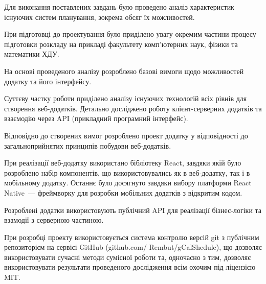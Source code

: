 
Для виконання поставлених завдань було проведено аналіз характеристик існуючих систем планування, зокрема обсяг їх можливостей.

При підготовці до проектування було приділено увагу окремим частини процесу підготовки розкладу на прикладі факультету комп’ютерних наук, фізики та математики ХДУ.

На основі проведеного аналізу розроблено базові вимоги щодо можливостей додатку та його інтерфейсу.

Суттєву частку роботи приділено аналізу існуючих технологій всіх рівнів для створення веб-додатків. Детально досліджено роботу клієнт-серверних додатків та взаємодію через API (прикладний програмний інтерфейс). 

Відповідно до створених вимог розроблено проект додатку у відповідності до загальноприйнятих принципів побудови веб-додатків.

При реалізації веб-додатку використано бібліотеку React, завдяки якій було розроблено набір компонентів, що використовувались як в веб-додатку, так і в мобільному додатку. Останнє було досягнуто завдяки вибору платформи React Native~--- фреймворку для розробки мобільних додатків з відкритим кодом.

Розроблені додатки використовують публічний API для реалізації бізнес-логіки та взамодії з серверною частиною.


При розробці проекту використовується система контролю версій git з публічним репозиторієм на сервісі GitHub (github.com/ Rembut/gCalShedule), що дозволяє використовувати сучасні методи сумісної роботи та, одночасно з тим, дозволяє використовувати результати проведеного дослідження всім охочим під ліцензією MIT.
